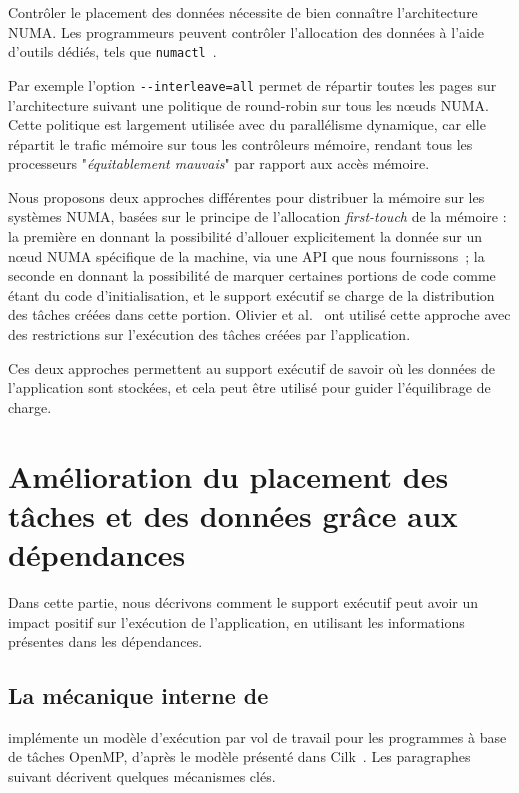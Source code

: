 \documentclass[parallelisme]{compas2016}
\begin{document}
Contrôler le placement des données nécessite de bien connaître l'architecture NUMA.
Les programmeurs peuvent contrôler l'allocation des données à l'aide d'outils
dédiés, tels que \verb/numactl/~\cite{DBLP:journals/corr/abs-1101-0093}.

Par exemple l'option \verb/--interleave=all/ permet de répartir toutes les pages
sur l'architecture suivant une politique de round-robin sur tous les nœuds NUMA.
Cette politique est largement utilisée avec du parallélisme dynamique,
car elle répartit le trafic mémoire sur tous les contrôleurs mémoire, rendant
tous les processeurs "\emph{équitablement mauvais}" par rapport aux accès mémoire.

Nous proposons deux approches différentes pour distribuer la mémoire sur les systèmes
NUMA, basées sur le principe de l'allocation \emph{first-touch} de la mémoire : la première
en donnant la possibilité d'allouer explicitement la donnée sur un nœud NUMA
spécifique de la machine, via une API que nous fournissons~\cite{Durand2013,BroFurGogWacNam10IJPP};
la seconde en donnant la possibilité de marquer certaines portions de code comme
étant du code d'initialisation, et le support exécutif se charge de la distribution
des tâches créées dans cette portion.
Olivier et al.~\cite{Olivier:2012:CMW:2388996.2389085} ont utilisé cette
approche avec des restrictions sur l'exécution des tâches créées par l'application.

Ces deux approches permettent au support exécutif de savoir où les données
de l'application sont stockées, et cela peut être utilisé pour guider l'équilibrage de charge.



\section{Amélioration du placement des tâches et des données grâce aux dépendances}
\label{sec:contributions}

Dans cette partie, nous décrivons comment le support exécutif peut avoir un impact
positif sur l'exécution de l'application, en utilisant les informations présentes
dans les dépendances.


\subsection{La mécanique interne de \kaapi}

\kaapi implémente un modèle d'exécution par vol de travail pour les programmes
à base de tâches OpenMP, d'après le modèle présenté dans Cilk~\cite{cilk5}.
Les paragraphes suivant décrivent quelques mécanismes clés.
\end{document}
